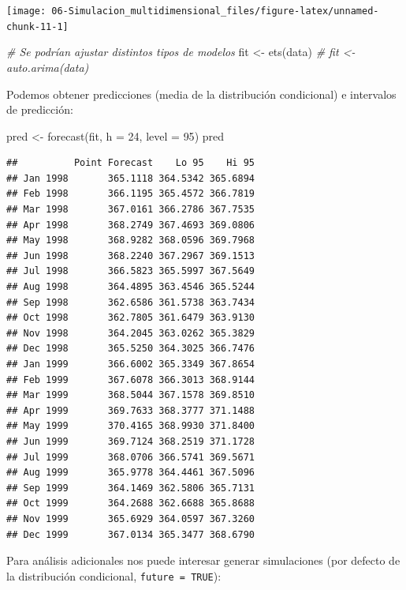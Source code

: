 \documentclass[
]{book}
\newenvironment{Shaded}{\begin{snugshade}}{\end{snugshade}}
\newcommand{\AttributeTok}[1]{\textcolor[rgb]{0.77,0.63,0.00}{#1}}
\newcommand{\CommentTok}[1]{\textcolor[rgb]{0.56,0.35,0.01}{\textit{#1}}}
\newcommand{\DecValTok}[1]{\textcolor[rgb]{0.00,0.00,0.81}{#1}}
\newcommand{\FunctionTok}[1]{\textcolor[rgb]{0.00,0.00,0.00}{#1}}
\newcommand{\NormalTok}[1]{#1}
\newcommand{\OtherTok}[1]{\textcolor[rgb]{0.56,0.35,0.01}{#1}}
\theoremstyle{break}
\theoremstyle{nonumberplain}
\begin{document}
\begin{center}\texttt{[image: 06-Simulacion\_multidimensional\_files/figure-latex/unnamed-chunk-11-1]} \end{center}

\begin{Shaded}
\begin{Highlighting}[]
\CommentTok{\# Se podrían ajustar distintos tipos de modelos}
\NormalTok{fit }\OtherTok{\textless{}{-}} \FunctionTok{ets}\NormalTok{(data)}
\CommentTok{\# fit \textless{}{-} auto.arima(data)}
\end{Highlighting}
\end{Shaded}

Podemos obtener predicciones (media de la distribución condicional) e intervalos de predicción:

\begin{Shaded}
\begin{Highlighting}[]
\NormalTok{pred }\OtherTok{\textless{}{-}} \FunctionTok{forecast}\NormalTok{(fit, }\AttributeTok{h =} \DecValTok{24}\NormalTok{, }\AttributeTok{level =} \DecValTok{95}\NormalTok{)}
\NormalTok{pred}
\end{Highlighting}
\end{Shaded}

\begin{verbatim}
##          Point Forecast    Lo 95    Hi 95
## Jan 1998       365.1118 364.5342 365.6894
## Feb 1998       366.1195 365.4572 366.7819
## Mar 1998       367.0161 366.2786 367.7535
## Apr 1998       368.2749 367.4693 369.0806
## May 1998       368.9282 368.0596 369.7968
## Jun 1998       368.2240 367.2967 369.1513
## Jul 1998       366.5823 365.5997 367.5649
## Aug 1998       364.4895 363.4546 365.5244
## Sep 1998       362.6586 361.5738 363.7434
## Oct 1998       362.7805 361.6479 363.9130
## Nov 1998       364.2045 363.0262 365.3829
## Dec 1998       365.5250 364.3025 366.7476
## Jan 1999       366.6002 365.3349 367.8654
## Feb 1999       367.6078 366.3013 368.9144
## Mar 1999       368.5044 367.1578 369.8510
## Apr 1999       369.7633 368.3777 371.1488
## May 1999       370.4165 368.9930 371.8400
## Jun 1999       369.7124 368.2519 371.1728
## Jul 1999       368.0706 366.5741 369.5671
## Aug 1999       365.9778 364.4461 367.5096
## Sep 1999       364.1469 362.5806 365.7131
## Oct 1999       364.2688 362.6688 365.8688
## Nov 1999       365.6929 364.0597 367.3260
## Dec 1999       367.0134 365.3477 368.6790
\end{verbatim}

Para análisis adicionales nos puede interesar generar simulaciones (por defecto de la distribución condicional, \texttt{future\ =\ TRUE}):
\end{document}
